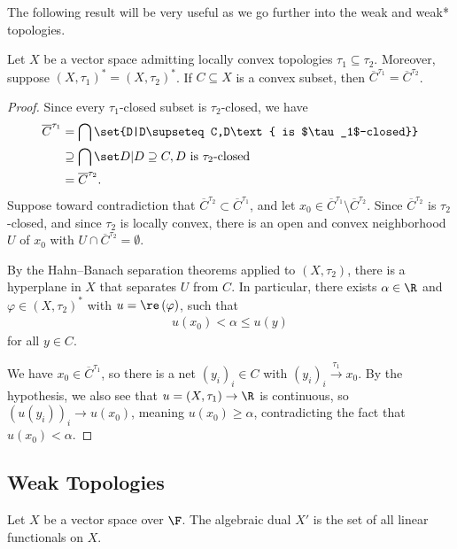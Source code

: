 \documentclass[10pt]{mypackage}
\begin{document}
The following result will be very useful as we go further into the weak and weak* topologies.
\begin{corollary}
  Let $X$ be a vector space admitting locally convex topologies $\tau_1\subseteq \tau_2$. Moreover, suppose $\left(X,\tau_1\right)^{\ast} = \left(X,\tau_2\right)^{\ast}$. If $C\subseteq X$ is a convex subset, then $\overline{C}^{\tau_1} = \overline{C}^{\tau_2}$.
\end{corollary}
\begin{proof}
  Since every $\tau_1$-closed subset is $\tau_2$-closed, we have
  \begin{align*}
    \overline{C}^{\tau_1} &= \bigcap\set{D|D\supseteq C,D\text{ is $\tau_1$-closed}}\\
                          &\supseteq \bigcap{\set D|D\supseteq C,D\text{ is $\tau_2$-closed}}\\
                          &= \overline{C}^{\tau_2}.
  \end{align*}
  Suppose toward contradiction that $\overline{C}^{\tau_2}\subset \overline{C}^{\tau_1} $, and let $x_0\in \overline{C}^{\tau_1} \setminus \overline{C}^{\tau_2}$. Since $\overline{C}^{\tau_2}$ is $\tau_2$-closed, and since $\tau_2$ is locally convex, there is an open and convex neighborhood $U$ of $x_0$ with $U\cap \overline{C}^{\tau_2} = \emptyset$.\newline

  By the Hahn--Banach separation theorems applied to $\left(X,\tau_2\right)$, there is a hyperplane in $X$ that separates $U$ from $C$. In particular, there exists $\alpha \in \R$ and $\varphi\in \left(X,\tau_2\right)^{\ast}$ with $u = \re\left(\varphi\right)$, such that
  \begin{align*}
    u\left(x_0\right) < \alpha \leq u\left(y\right)
  \end{align*}
  for all $y\in C$.\newline

  We have $x_0\in \overline{C}^{\tau_1}$, so there is a net $\left(y_i\right)_i\in C$ with $\left(y_i\right)_i\xrightarrow{\tau_1}x_0$. By the hypothesis, we also see that $u = \left(X,\tau_1\right)\rightarrow \R$ is continuous, so $\left(u\left(y_i\right)\right)_i\rightarrow u\left(x_0\right)$, meaning $u\left(x_0\right) \geq \alpha$, contradicting the fact that $u\left(x_0\right) < \alpha$.
\end{proof}
\subsection{Weak Topologies}%
Let $X$ be a vector space over $\F$. The algebraic dual $X'$ is the set of all linear functionals on $X$.\newline
\end{document}
